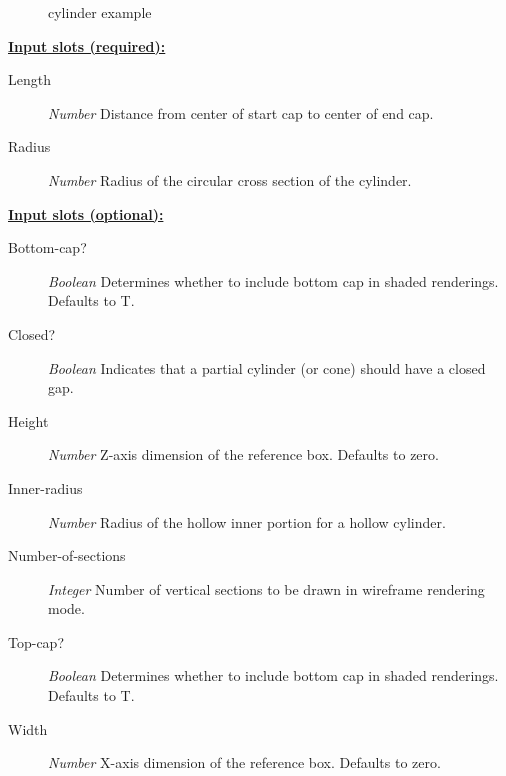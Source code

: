 \documentclass [11pt]{book}
\begin{document}
\begin{itemize}
\begin{figure}
\caption{cylinder example}

\label{fig:cylinder}

\end{figure}





\textbf{
\underline{Input slots (required):}}

\begin{description}

\item [Length]
\emph{Number} Distance from center of start cap to center of end cap.


\item [Radius]
\emph{Number} Radius of the circular cross section of the cylinder.


\end{description}






\textbf{
\underline{Input slots (optional):}}

\begin{description}

\item [Bottom-cap?]
\emph{Boolean} Determines whether to include bottom cap in shaded renderings. Defaults to T.


\item [Closed?]
\emph{Boolean} Indicates that a partial cylinder (or cone) should have a closed gap.


\item [Height]
\emph{Number} Z-axis dimension of the reference box. Defaults to zero.


\item [Inner-radius]
\emph{Number} Radius of the hollow inner portion for a hollow cylinder.


\item [Number-of-sections]
\emph{Integer} Number of vertical sections to be drawn in wireframe rendering mode.


\item [Top-cap?]
\emph{Boolean} Determines whether to include bottom cap in shaded renderings. Defaults to T.


\item [Width]
\emph{Number} X-axis dimension of the reference box. Defaults to zero.



\end{description}
\end{itemize}
\end{document}
